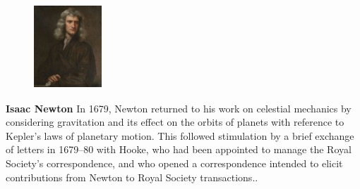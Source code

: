 \documentclass{SFEE}
\begin{document}
\begin{figure} 
    \includegraphics[width=1in,height=1.25in,clip,keepaspectratio]{Portrait_of_Sir_Isaac_Newton,_1689}
  \end{figure}\par
  \textbf{Isaac Newton} In 1679, Newton returned to his work on celestial mechanics by considering gravitation and its effect on the orbits of planets with reference to Kepler's laws of planetary motion. This followed stimulation by a brief exchange of letters in 1679–80 with Hooke, who had been appointed to manage the Royal Society's correspondence, and who opened a correspondence intended to elicit contributions from Newton to Royal Society transactions..\par
\end{document}
